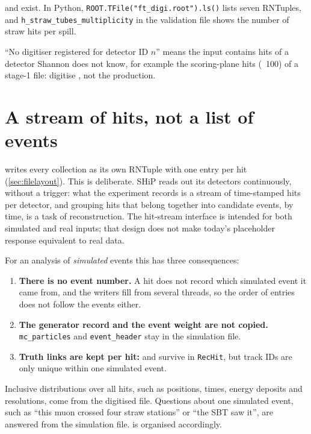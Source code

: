 \begin{checkpoint}
 and  exist. In
Python, \texttt{ROOT.TFile("ft\_digi.root").ls()} lists seven RNTuples, and
\texttt{h\_straw\_tubes\_multiplicity} in the validation file shows the number
of straw hits per spill.
\end{checkpoint}

\begin{pitfall}
``No digitiser registered for detector ID $n$'' means the input contains hits
of a detector Shannon does not know, for example the scoring-plane hits
(~100) of a stage-1 file: digitise ,
not the production.
\end{pitfall}

\section{A stream of hits, not a list of events}
\label{sec:digilayout}

 writes every collection as its own RNTuple with one entry per
hit (\cref{sec:filelayout}). This is deliberate. SHiP reads out its detectors
continuously, without a trigger: what the experiment records is a stream of
time-stamped hits per detector, and grouping hits that belong together into
candidate events, by time, is a task of reconstruction. The hit-stream interface is intended for both simulated and real inputs;
that design does not make today's placeholder response equivalent to real data.

For an analysis of \emph{simulated} events this has three consequences:

\begin{enumerate}
  \item \textbf{There is no event number.} A hit does not record which
        simulated event it came from, and the writers fill from several
        threads, so the order of entries does not follow the events either.
  \item \textbf{The generator record and the event weight are not copied.}
        \texttt{mc\_particles} and \texttt{event\_header} stay in the
        simulation file.
  \item \textbf{Truth links are kept per hit:}  and
         survive in \texttt{RecHit}, but track IDs are only
        unique within one simulated event.
\end{enumerate}

Inclusive distributions over all hits, such as positions, times, energy
deposits and resolutions, come from the digitised file. Questions about one
simulated event, such as ``this muon crossed four straw stations'' or
``the SBT saw it'', are answered from the simulation file.
 is organised accordingly.

